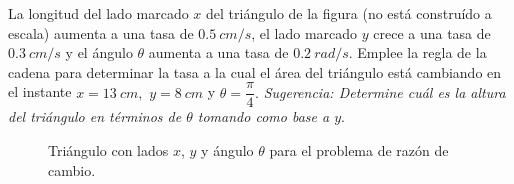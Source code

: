 \begin{prob}
La longitud del lado marcado $x$ del triángulo de la figura (no está construído a escala) aumenta a una tasa de $0.5\ cm/s$, el lado marcado $y$ crece a una tasa de $0.3\ cm/s$ y el ángulo $\theta$ aumenta a una tasa de $0.2\ rad/s.$ Emplee la regla de la cadena para determinar la tasa a la cual el área del triángulo está cambiando en el instante $x=13\ cm,$ $y=8\ cm$ y $\theta= \dfrac{\pi}{4}.$
\textit{Sugerencia: Determine cuál es la altura del triángulo en términos de $\theta$ tomando como base a $y.$}
\begin{figure}[!htbp]
\centering
{}
\caption{Triángulo con lados $x$, $y$ y ángulo $\theta$ para el problema de razón de cambio.}
\label{fig:triangulo_cadena}
\end{figure}
\end{prob}
